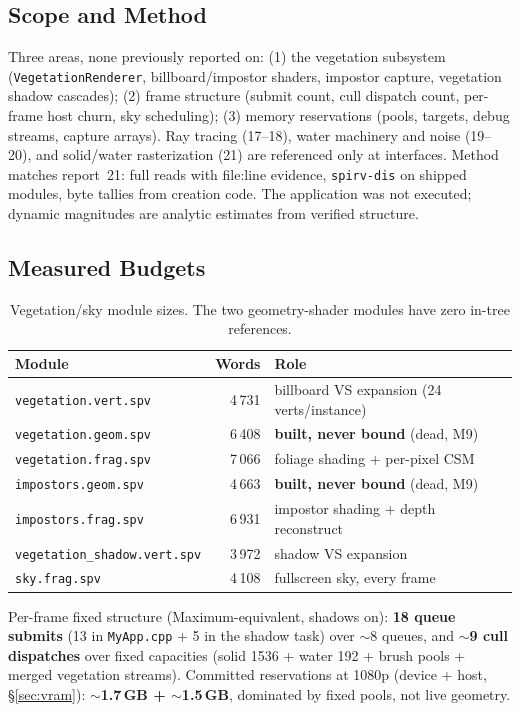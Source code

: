 \documentclass[11pt,a4paper]{article}
\begin{document}
\subsection{Scope and Method}

Three areas, none previously reported on: (1) the vegetation subsystem
(\texttt{VegetationRenderer}, billboard/impostor shaders, impostor capture,
vegetation shadow cascades); (2) frame structure (submit count, cull
dispatch count, per-frame host churn, sky scheduling); (3) memory
reservations (pools, targets, debug streams, capture arrays). Ray tracing
(17--18), water machinery and noise (19--20), and solid/water rasterization
(21) are referenced only at interfaces. Method matches report~21: full reads
with file:line evidence, \texttt{spirv-dis} on shipped modules, byte tallies
from creation code. The application was not executed; dynamic magnitudes are
analytic estimates from verified structure.

\subsection{Measured Budgets}

\begin{table}[h]
\centering
\small
\begin{tabular}{@{}lrl@{}}
\toprule
\textbf{Module} & \textbf{Words} & \textbf{Role} \\
\midrule
\texttt{vegetation.vert.spv} & 4\,731 & billboard VS expansion (24 verts/instance) \\
\texttt{vegetation.geom.spv} & 6\,408 & \textbf{built, never bound} (dead, M9) \\
\texttt{vegetation.frag.spv} & 7\,066 & foliage shading + per-pixel CSM \\
\texttt{impostors.geom.spv} & 4\,663 & \textbf{built, never bound} (dead, M9) \\
\texttt{impostors.frag.spv} & 6\,931 & impostor shading + depth reconstruct \\
\texttt{vegetation\_shadow.vert.spv} & 3\,972 & shadow VS expansion \\
\texttt{sky.frag.spv} & 4\,108 & fullscreen sky, every frame \\
\bottomrule
\end{tabular}
\caption{Vegetation/sky module sizes. The two geometry-shader modules have
zero in-tree references.}
\end{table}

Per-frame fixed structure (Maximum-equivalent, shadows on): \textbf{18 queue
submits} (13 in \texttt{MyApp.cpp} + 5 in the shadow task) over $\sim$8
queues, and \textbf{$\sim$9 cull dispatches} over fixed capacities (solid
1536 + water 192 + brush pools + merged vegetation streams). Committed
reservations at 1080p (device + host, \S\ref{sec:vram}): \textbf{$\sim$1.7\,GB
+ $\sim$1.5\,GB}, dominated by fixed pools, not live geometry.
\end{document}
